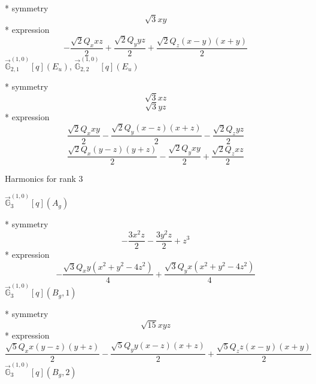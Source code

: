 \documentclass[fleqn,8pt]{jsarticle}
\begin{document}
\noindent\quad ** symmetry
\begin{dmath*}
\sqrt{3} x y
\end{dmath*}
\noindent\quad ** expression
\begin{dmath*}
- \frac{\sqrt{2} Q_{x} x z}{2} + \frac{\sqrt{2} Q_{y} y z}{2} + \frac{\sqrt{2} Q_{z} \left(x - y\right) \left(x + y\right)}{2}
\end{dmath*}
\noindent\quad $\vec{\mathbb{G}}_{2,1}^{(1,0)}[q](E_{u})$, $\vec{\mathbb{G}}_{2,2}^{(1,0)}[q](E_{u})$

\noindent\quad ** symmetry
\begin{dmath*}
\sqrt{3} x z
\end{dmath*}
\begin{dmath*}
\sqrt{3} y z
\end{dmath*}
\noindent\quad ** expression
\begin{dmath*}
\frac{\sqrt{2} Q_{x} x y}{2} - \frac{\sqrt{2} Q_{y} \left(x - z\right) \left(x + z\right)}{2} - \frac{\sqrt{2} Q_{z} y z}{2}
\end{dmath*}
\begin{dmath*}
\frac{\sqrt{2} Q_{x} \left(y - z\right) \left(y + z\right)}{2} - \frac{\sqrt{2} Q_{y} x y}{2} + \frac{\sqrt{2} Q_{z} x z}{2}
\end{dmath*}

\noindent * Harmonics for rank 3

\noindent\quad $\vec{\mathbb{G}}_{3}^{(1,0)}[q](A_{g})$

\noindent\quad ** symmetry
\begin{dmath*}
- \frac{3 x^{2} z}{2} - \frac{3 y^{2} z}{2} + z^{3}
\end{dmath*}
\noindent\quad ** expression
\begin{dmath*}
- \frac{\sqrt{3} Q_{x} y \left(x^{2} + y^{2} - 4 z^{2}\right)}{4} + \frac{\sqrt{3} Q_{y} x \left(x^{2} + y^{2} - 4 z^{2}\right)}{4}
\end{dmath*}
\noindent\quad $\vec{\mathbb{G}}_{3}^{(1,0)}[q](B_{g},1)$

\noindent\quad ** symmetry
\begin{dmath*}
\sqrt{15} x y z
\end{dmath*}
\noindent\quad ** expression
\begin{dmath*}
\frac{\sqrt{5} Q_{x} x \left(y - z\right) \left(y + z\right)}{2} - \frac{\sqrt{5} Q_{y} y \left(x - z\right) \left(x + z\right)}{2} + \frac{\sqrt{5} Q_{z} z \left(x - y\right) \left(x + y\right)}{2}
\end{dmath*}
\noindent\quad $\vec{\mathbb{G}}_{3}^{(1,0)}[q](B_{g},2)$
\end{document}
